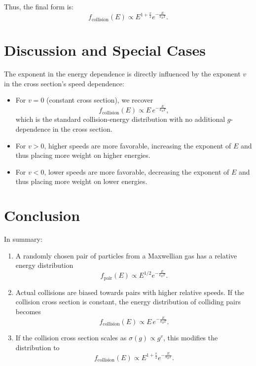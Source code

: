 Thus, the final form is:
\begin{equation}
  f_{\text{collision}}(E) \propto E^{1 + \frac{v}{2}} e^{-\frac{E}{k_B T}}.
\end{equation}

\section{Discussion and Special Cases}

The exponent in the energy dependence is directly influenced by the exponent $v$ in the cross section's speed dependence:
\begin{itemize}
  \item For $v=0$ (constant cross section), we recover 
  \[
  f_{\text{collision}}(E) \propto E \, e^{-\frac{E}{k_B T}},
  \]
  which is the standard collision-energy distribution with no additional $g$-dependence in the cross section.

  \item For $v > 0$, higher speeds are more favorable, increasing the exponent of $E$ and thus placing more weight on higher energies.

  \item For $v < 0$, lower speeds are more favorable, decreasing the exponent of $E$ and thus placing more weight on lower energies.
\end{itemize}

\section{Conclusion}

In summary:
\begin{enumerate}
  \item A randomly chosen pair of particles from a Maxwellian gas has a relative energy distribution
  \[
  f_{\text{pair}}(E) \propto E^{1/2} e^{-\frac{E}{k_B T}}.
  \]

  \item Actual collisions are biased towards pairs with higher relative speeds. If the collision cross section is constant, the energy distribution of colliding pairs becomes
  \[
  f_{\text{collision}}(E) \propto E \, e^{-\frac{E}{k_B T}}.
  \]

  \item If the collision cross section scales as $\sigma(g) \propto g^{v}$, this modifies the distribution to
  \[
  f_{\text{collision}}(E) \propto E^{1 + \frac{v}{2}} e^{-\frac{E}{k_B T}}.
  \]
  \end{enumerate}

